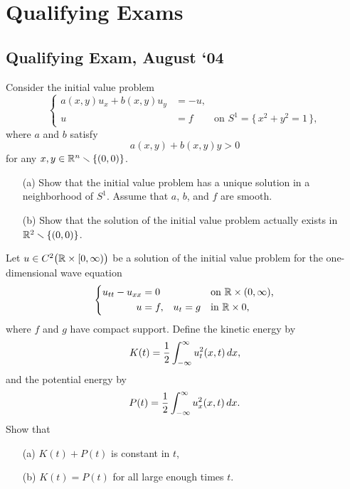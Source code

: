 \section{Qualifying Exams}
\subsection{Qualifying Exam, August `04}
\begin{problem}
  Consider the initial value problem
  \[
    \left\{
      \begin{aligned}
        a(x,y)u_x+b(x,y)u_y&=-u,\\
        u&=f&\text{on \(S^1=\bigl\{\,x^2+y^2=1\,\bigr\}\)},
      \end{aligned}
    \right.
  \]
  where \(a\) and \(b\) satisfy
  \[
    a(x,y)+b(x,y)y>0
  \]
  for any \(x,y\in\mathbb{R}^n\smallsetminus\{(0,0)\}\).
  \begin{itemize}[noitemsep]
  \item[(a)] Show that the initial value problem has a unique solution in a
    neighborhood of \(S^1\). Assume that \(a\), \(b\), and \(f\) are
    smooth.
  \item[(b)] Show that the solution of the initial value problem actually
    exists in \(\mathbb{R}^2\smallsetminus\{(0,0)\}\).
  \end{itemize}
\end{problem}
\begin{solution*}
\end{solution*}

\begin{problem}
  Let \(u\in C^2\bigl(\mathbb{R}\times[0,\infty)\bigr)\) be a solution of the
  initial value problem for the one-dimensional wave equation
  \[
    \left\{
      \begin{aligned}
        u_{tt}-u_{xx}&=0&&&&\text{on \(\mathbb{R}\times(0,\infty)\),}\\
        u&=f,&u_t&=g&&\text{in \(\mathbb{R}\times 0\),}
      \end{aligned}
    \right.
  \]
  where \(f\) and \(g\) have compact support. Define the kinetic energy by
  \[
    K(t)=\frac{1}{2}\int_{-\infty}^\infty u_t^2(x,t)\mathop{}\!d x,
  \]
  and the potential energy by
  \[
    P(t)=\frac{1}{2}\int_{-\infty}^\infty u_x^2(x,t)\mathop{}\!d x.
  \]
  Show that
  \begin{itemize}[noitemsep]
  \item[(a)] \(K(t)+P(t)\) is constant in \(t\),
  \item[(b)] \(K(t)=P(t)\) for all large enough times \(t\).
  \end{itemize}
\end{problem}
\begin{solution*}
\end{solution*}

